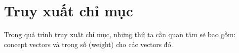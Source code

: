 \section{Truy xuất chỉ mục}
Trong quá trình truy xuất chỉ mục, những thứ ta cần quan tâm sẽ bao gồm: concept vectors và trọng số (weight) cho các vectors đó.


